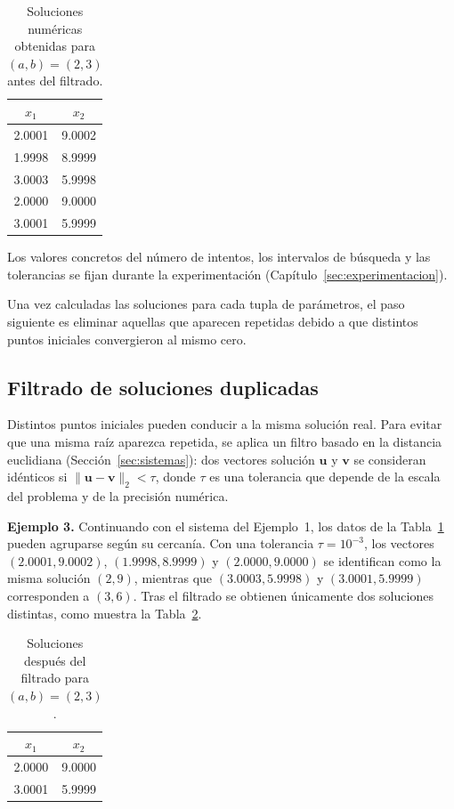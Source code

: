 \begin{table}[H]
\centering \caption{Soluciones numéricas obtenidas para \((a,b) = (2,3)\) antes del filtrado.} \label{tab:soluciones_brutas}
\begin{tabular}{c|c}
\(x_1\) & \(x_2\) \\
\hline 2.0001 & 9.0002 \\
1.9998 & 8.9999 \\
3.0003 & 5.9998 \\
2.0000 & 9.0000 \\
3.0001 & 5.9999 \\
\end{tabular}
\end{table}

Los valores concretos del número de intentos, los intervalos de búsqueda y las tolerancias se fijan durante la experimentación (Capítulo~\ref{sec:experimentacion}).

Una vez calculadas las soluciones para cada tupla de parámetros, el paso siguiente es eliminar aquellas que aparecen repetidas debido a que distintos puntos iniciales convergieron al mismo cero.

\subsection{Filtrado de soluciones duplicadas}

Distintos puntos iniciales pueden conducir a la misma solución real. Para evitar que una misma raíz aparezca repetida, se aplica un filtro basado en la distancia euclidiana (Sección~\ref{sec:sistemas}): dos vectores solución \(\mathbf{u}\) y
\(\mathbf{v}\) se consideran idénticos si
\(\|\mathbf{u} - \mathbf{v}\|_2 < \tau\), donde \(\tau\) es una
tolerancia que depende de la escala del problema y de la precisión numérica.

\noindent\textbf{Ejemplo 3.} Continuando con el sistema del Ejemplo~1, los datos de la Tabla~\ref{tab:soluciones_brutas} pueden agruparse según su cercanía. Con una tolerancia \(\tau = 10^{-3}\), los vectores
\((2.0001, 9.0002)\), \((1.9998, 8.9999)\) y \((2.0000, 9.0000)\) se
identifican como la misma solución \((2,9)\), mientras que
\((3.0003, 5.9998)\) y \((3.0001, 5.9999)\) corresponden a \((3,6)\).
Tras el filtrado se obtienen únicamente dos soluciones distintas, como muestra la Tabla~\ref{tab:soluciones_filtradas}.

\begin{table}[H]
\centering \caption{Soluciones después del filtrado para \((a,b) = (2,3)\).} \label{tab:soluciones_filtradas}
\begin{tabular}{c|c}
\(x_1\) & \(x_2\) \\
\hline 2.0000 & 9.0000 \\
3.0001 & 5.9999 \\
\end{tabular}
\end{table}

